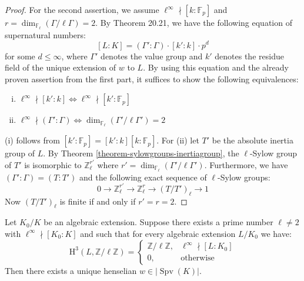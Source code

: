 \begin{proof}
For the second assertion, we assume $\ell^\infty\nmid [k:\mathbb{F}_p]$ and $r=\dim_{\mathbb{F}_\ell}(\Gamma / \ell\Gamma) = 2$. By \cite{En72} Theorem 20.21, we have the following equation of supernatural numbers:
\[ [L:K] = (\Gamma':\Gamma) \cdot [k':k]\cdot p^d \]
for some $d \leq \infty$, where $\Gamma'$ denotes the value group and $k'$ denotes the residue field of the unique extension of $w$ to $L$. By using this equation and the already proven assertion from the first part, it suffices to show the following equivalences:
\begin{enumerate}[(i)]
\item $\ell^\infty \nmid [k':k] \iff \ell^\infty \nmid [k':\mathbb{F}_p]$
\item $\ell^\infty\nmid (\Gamma':\Gamma) \iff \dim_{\mathbb{F}_\ell}(\Gamma'/\ell\Gamma')=2$
\end{enumerate}
(i) follows from $[k':\mathbb{F}_p]=[k':k][k:\mathbb{F}_p]$. For (ii) let $T'$ be the absolute inertia group of $L$. By Theorem \ref{theorem-sylowgroups-inertiagroup}, the $\ell$-Sylow group of $T'$ is isomorphic to $\mathbb{Z}_\ell^{r'}$ where $r'=\dim_{\mathbb{F}_\ell}(\Gamma'/\ell\Gamma')$. Furthermore, we have $(\Gamma':\Gamma) = (T:T')$ and the following exact sequence of $\ell$-Sylow groups:
\[ 0 \longrightarrow \mathbb{Z}_\ell^{r'} \longrightarrow \mathbb{Z}_\ell^{r}\longrightarrow (T/T')_\ell\longrightarrow 1 \]
Now $(T/T')_\ell$ is finite if and only if $r'=r=2$.
\end{proof}

\begin{proposition}\label{2.6}
Let $K_0/K$ be an algebraic extension. Suppose there exists a prime number $\ell\neq 2$ with $\ell^\infty\nmid[K_0:K]$ and such that for every algebraic extension $L/K_0$ we have: 
\[ \mathrm{H}^3(L,\mathbb{Z}/\ell\mathbb{Z}) = \begin{cases}
\mathbb{Z}/\ell\mathbb{Z}, & \ell^\infty\nmid [L:K_0]\\
0, & \text{otherwise}
\end{cases} \]
Then there exists a unique henselian $w\in|\operatorname{Spv}(K)|$.
\end{proposition}

